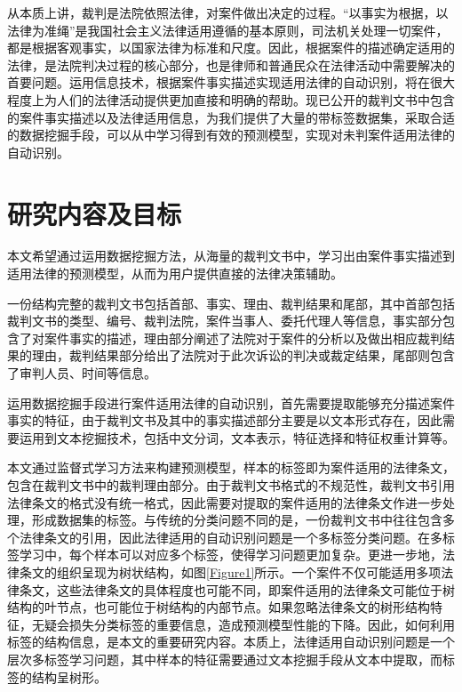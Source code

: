     从本质上讲，裁判是法院依照法律，对案件做出决定的过程。“以事实为根据，以法律为准绳”是我国社会主义法律适用遵循的基本原则，司法机关处理一切案件，都是根据客观事实，以国家法律为标准和尺度。因此，根据案件的描述确定适用的法律，是法院判决过程的核心部分，也是律师和普通民众在法律活动中需要解决的首要问题。运用信息技术，根据案件事实描述实现适用法律的自动识别，将在很大程度上为人们的法律活动提供更加直接和明确的帮助。现已公开的裁判文书中包含的案件事实描述以及法律适用信息，为我们提供了大量的带标签数据集，采取合适的数据挖掘手段，可以从中学习得到有效的预测模型，实现对未判案件适用法律的自动识别。


    \section{研究内容及目标}
    本文希望通过运用数据挖掘方法，从海量的裁判文书中，学习出由案件事实描述到适用法律的预测模型，从而为用户提供直接的法律决策辅助。

    一份结构完整的裁判文书包括首部、事实、理由、裁判结果和尾部，其中首部包括裁判文书的类型、编号、裁判法院，案件当事人、委托代理人等信息，事实部分包含了对案件事实的描述，理由部分阐述了法院对于案件的分析以及做出相应裁判结果的理由，裁判结果部分给出了法院对于此次诉讼的判决或裁定结果，尾部则包含了审判人员、时间等信息。

    运用数据挖掘手段进行案件适用法律的自动识别，首先需要提取能够充分描述案件事实的特征，由于裁判文书及其中的事实描述部分主要是以文本形式存在，因此需要运用到文本挖掘技术\cite{aggarwal2012mining}，包括中文分词，文本表示，特征选择和特征权重计算等。

    本文通过监督式学习方法来构建预测模型，样本的标签即为案件适用的法律条文，包含在裁判文书中的裁判理由部分。由于裁判文书格式的不规范性，裁判文书引用法律条文的格式没有统一格式，因此需要对提取的案件适用的法律条文作进一步处理，形成数据集的标签。与传统的分类问题不同的是，一份裁判文书中往往包含多个法律条文的引用，因此法律适用的自动识别问题是一个多标签分类问题\cite{tsoumakas2006multi}。在多标签学习中，每个样本可以对应多个标签，使得学习问题更加复杂。更进一步地，法律条文的组织呈现为树状结构，如图\ref{Figure1}所示。一个案件不仅可能适用多项法律条文，这些法律条文的具体程度也可能不同，即案件适用的法律条文可能位于树结构的叶节点，也可能位于树结构的内部节点。如果忽略法律条文的树形结构特征，无疑会损失分类标签的重要信息，造成预测模型性能的下降。因此，如何利用标签的结构信息，是本文的重要研究内容。本质上，法律适用自动识别问题是一个层次多标签学习问题\cite{barutcuoglu2006hierarchical}，其中样本的特征需要通过文本挖掘手段从文本中提取，而标签的结构呈树形。
    
